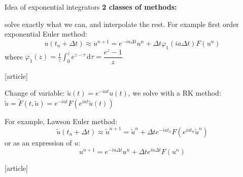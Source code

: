\documentclass{beamer}
\newcommand{\mbold}[1]{{\textbf{\color{PLB}#1}}}
\newcommand{\customcite}[1]{\cite{#1}}
\begin{document}
\begin{frame}{Idea of exponential integrators}
  \textbf{\color{mblue} 2 classes of methods:}
  \begin{description}[leftmargin=0.25cm]
    \item[\mbold{exponential Runge-Kutta:}] solve exactly what we can, and interpolate the rest. For example first order exponential Euler method:
      $$
        u(t_n+\Delta t) \approx u^{n+1} = e^{-ia\Delta t}u^n + \Delta t\varphi_1(ia\Delta t)F(u^n)
      $$
      where $\varphi_1(z) = \frac{1}{z}\int_0^z e^{z-\tau}\,\mathrm{d}\tau = \dfrac{e^z - 1}{z}$
      \vspace{-0.1cm}
      \begin{thebibliography}{9}
        [article]
         \customcite{Hochbruck:2010}
      \end{thebibliography}
    \item[\mbold{Lawson:}] Change of variable: $\tilde{u}(t)=e^{-iat}u(t)$, we solve with a RK method: $\dot{\tilde{u}} = \tilde{F}(t,\tilde{u}) = e^{-iat}F(e^{iat}\tilde{u}(t))$

      For example, Lawson Euler method:
      $$
        \tilde{u}(t_n+\Delta t)\approx \tilde{u}^{n+1} = \tilde{u}^n + \Delta t e^{-iat_n}F(e^{iat_n}\tilde{u}^n)
      $$
      or as an expression of $u$:
      $$
        u^{n+1} = e^{-ia\Delta t}u^n + \Delta te^{ia\Delta t}F(u^n)
      $$
      \vspace{-0.75cm}
      \begin{thebibliography}{9}
        [article]
         \customcite{Isherwood:2018}
      \end{thebibliography}
  \end{description}
\end{frame}
\end{document}
